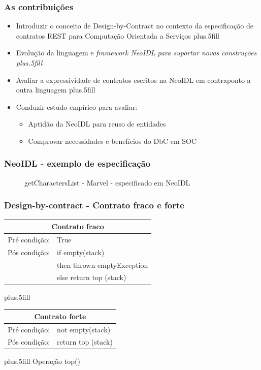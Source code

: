 \documentclass{beamer}
\begin{document}
\begin{frame}
\frametitle{As contribuições}

\begin{itemize}  
  \item Introduzir o conceito de \alert{Design-by-Contract} no contexto da
  especificação de contratos REST para Computação Orientada a Serviços 
  \pause
  \vskip0pt plus.5fill
  \item Evolução da linguagem e \it{framework} NeoIDL para suportar \alert{novas
  construções}
  \vskip0pt plus.5fill
  \pause
  \item Avaliar a expressividade de contratos escritos na NeoIDL em
  contraponto a outra linguagem 
  \vskip0pt plus.5fill
  \pause
  \item Conduzir \alert{estudo empírico} para avaliar:
    \begin{itemize}
    \item Aptidão da NeoIDL para reuso de entidades
    \item Comprovar necessidades e benefícios do DbC em SOC
  \end{itemize}

\end{itemize}

\end{frame}


\begin{frame}
\frametitle{NeoIDL - exemplo de especificação}

\begin{figure}[htb]
\begin{tiny}

\end{tiny}

getCharactersList - Marvel - especificado em NeoIDL
\end{figure}

\end{frame}


\begin{frame}
\frametitle{Design-by-contract - Contrato fraco e forte}

\begin{tabular}{|r|p{5cm}|}
\hline \multicolumn{2}{|c|}{Contrato fraco} \\ \hline
Pré condição: & True\\
Pós condição: & if empty(stack)\\ 
 & then thrown emptyException \\ 
 & else return top (stack) \\ \hline
\end{tabular}

\vskip0pt plus.5fill

\begin{tabular}{|r|p{5cm}|}
\hline \multicolumn{2}{|c|}{Contrato forte} \\ \hline
Pré condição: & not empty(stack) \\
Pós condição: & return top (stack) \\ \hline
\end{tabular}

\vskip0pt plus.5fill
Operação top()

\end{frame}
\end{document}
